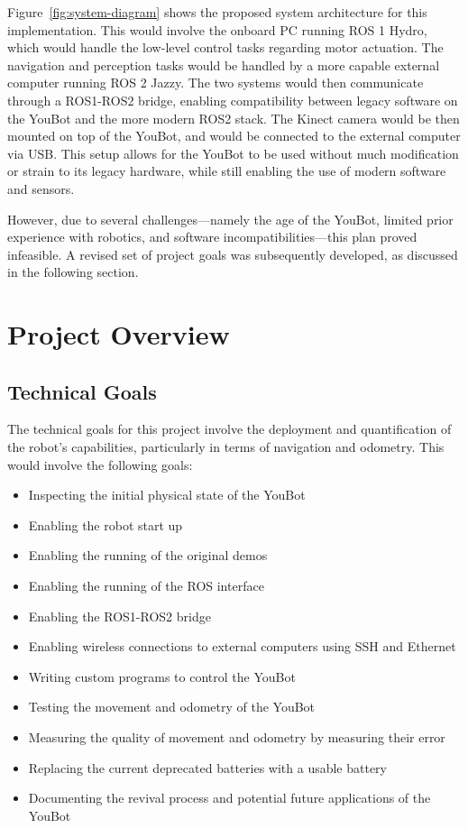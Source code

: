\documentclass[a4paper, 12pt]{article}
\begin{document}
    Figure~\ref{fig:system-diagram} shows the proposed system architecture for this implementation. This would involve the onboard PC running ROS 1 Hydro, which would handle the low-level control tasks regarding motor actuation. The navigation and perception tasks would be handled by a more capable external computer running ROS 2 Jazzy. The two systems would then communicate through a ROS1-ROS2 bridge,  enabling compatibility between legacy software on the YouBot and the more modern ROS2 stack. The Kinect camera would be then mounted on top of the YouBot, and would be connected to the external computer via USB. This setup allows for the YouBot to be used without much modification or strain to its legacy hardware, while still enabling the use of modern software and sensors.

    However, due to several challenges—namely the age of the YouBot, limited prior experience with robotics, and software incompatibilities—this plan proved infeasible. A revised set of project goals was subsequently developed, as discussed in the following section.

    \pagebreak
    
    \section{Project Overview}

    \subsection{Technical Goals}

    The technical goals for this project involve the deployment and quantification of the robot's capabilities, particularly in terms of navigation and odometry. This would involve the following goals: 
    \begin{itemize}[noitemsep, topsep=0pt]
        \item Inspecting the initial physical state of the YouBot
        \item Enabling the robot start up
        \item Enabling the running of the original demos
        \item Enabling the running of the ROS interface
        \item Enabling the ROS1-ROS2 bridge
        \item Enabling wireless connections to external computers using SSH and Ethernet
        \item Writing custom programs to control the YouBot
        \item Testing the movement and odometry of the YouBot
        \item Measuring the quality of movement and odometry by measuring their error
        \item Replacing the current deprecated batteries with a usable battery
        \item Documenting the revival process and potential future applications of the YouBot
    \end{itemize}
    
\end{document}
